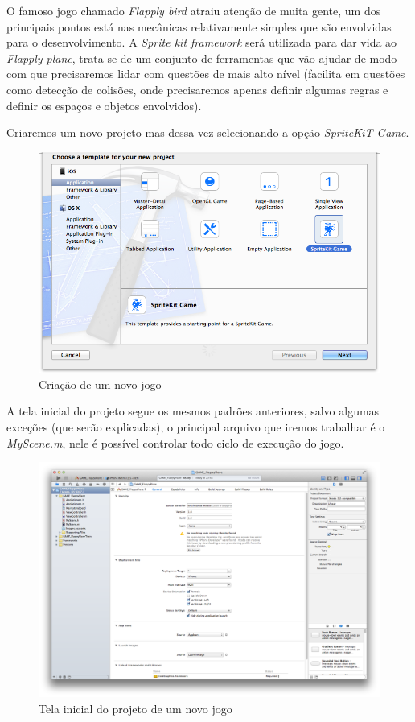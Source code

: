 \documentclass[a4paper,12pt,brazil,doubleside]{book}
\begin{document}
\begin{singlespace}
O famoso jogo chamado \emph{Flapply bird} atraiu atenção de muita gente, um dos principais pontos está nas mecânicas relativamente simples que são envolvidas para o desenvolvimento.
A \emph{Sprite kit framework} será utilizada para dar vida ao \emph{Flapply plane}, trata-se de um conjunto de ferramentas que vão ajudar de modo com que precisaremos lidar com questões de mais alto nível (facilita em questões como detecção de colisões, onde precisaremos apenas definir algumas regras e definir os espaços e objetos envolvidos).

Criaremos um novo projeto mas dessa vez selecionando a opção \emph{SpriteKiT Game}.

\begin{figure}[H]
  \centering
  \includegraphics[width=1\textwidth]{figuras/6/plane1.png}
  \caption{Criação de um novo jogo}
  \label{fig:a}
\end{figure}

A tela inicial do projeto segue os mesmos padrões anteriores, salvo algumas exceções (que serão explicadas), o principal arquivo que iremos trabalhar é o \emph{MyScene.m}, nele é possível controlar todo ciclo de execução do jogo.

\begin{figure}[H]
  \centering
  \includegraphics[width=1\textwidth]{figuras/6/plane2.png}
  \caption{Tela inicial do projeto de um novo jogo}
  \label{fig:a}
\end{figure}


\end{singlespace}
\end{document}
